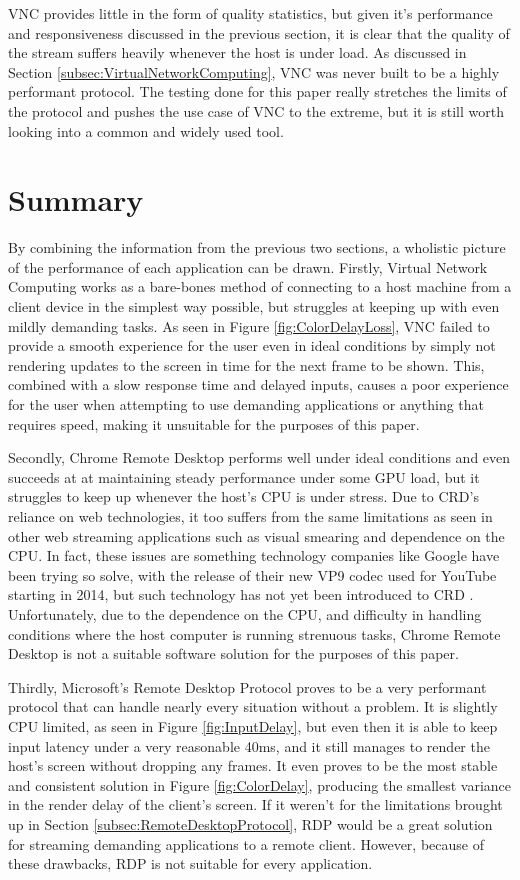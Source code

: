 VNC provides little in the form of quality statistics, but given it's performance and responsiveness discussed in the previous section, it is clear that the quality of the stream suffers heavily whenever the host is under load.
As discussed in Section \ref{subsec:VirtualNetworkComputing}, VNC was never built to be a highly performant protocol.
The testing done for this paper really stretches the limits of the protocol and pushes the use case of VNC to the extreme, but it is still worth looking into a common and widely used tool.

\section{Summary}\label{sec:EvaluationSummary}

By combining the information from the previous two sections, a wholistic picture of the performance of each application can be drawn. Firstly, Virtual Network Computing works as a bare-bones method of connecting to a host machine from a client device in the simplest way possible, but struggles at keeping up with even mildly demanding tasks.
As seen in Figure \ref{fig:ColorDelayLoss}, VNC failed to provide a smooth experience for the user even in ideal conditions by simply not rendering updates to the screen in time for the next frame to be shown.
This, combined with a slow response time and delayed inputs, causes a poor experience for the user when attempting to use demanding applications or anything that requires speed, making it unsuitable for the purposes of this paper.

Secondly, Chrome Remote Desktop performs well under ideal conditions and even succeeds at at maintaining steady performance under some GPU load, but it struggles to keep up whenever the host's CPU is under stress.
Due to CRD's reliance on web technologies, it too suffers from the same limitations as seen in other web streaming applications such as visual smearing and dependence on the CPU.
In fact, these issues are something technology companies like Google have been trying so solve, with the release of their new VP9 codec used for YouTube starting in 2014, but such technology has not yet been introduced to CRD \cite{google_io_vp9}.
Unfortunately, due to the dependence on the CPU, and difficulty in handling conditions where the host computer is running strenuous tasks, Chrome Remote Desktop is not a suitable software solution for the purposes of this paper.

Thirdly, Microsoft's Remote Desktop Protocol proves to be a very performant protocol that can handle nearly every situation without a problem.
It is slightly CPU limited, as seen in Figure \ref{fig:InputDelay}, but even then it is able to keep input latency under a very reasonable 40ms, and it still manages to render the host's screen without dropping any frames.
It even proves to be the most stable and consistent solution in Figure \ref{fig:ColorDelay}, producing the smallest variance in the render delay of the client's screen.
If it weren't for the limitations brought up in Section \ref{subsec:RemoteDesktopProtocol}, RDP would be a great solution for streaming demanding applications to a remote client.
However, because of these drawbacks, RDP is not suitable for every application.

